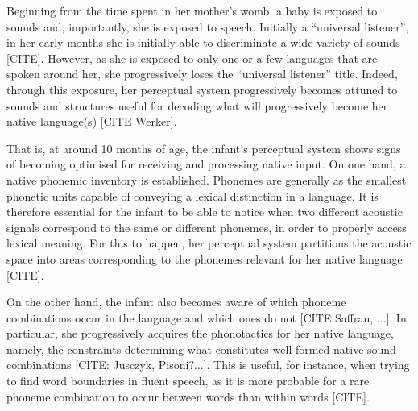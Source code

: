 
Beginning from the time spent in her mother's womb, a baby is exposed to sounds and, importantly, she is exposed to speech. Initially a ``universal listener'', in her early months she is initially able to discriminate a wide variety of sounds [CITE]. However, as she is exposed to only one or a few languages that are spoken around her, she progressively loses the ``universal listener'' title. Indeed, through this exposure, her perceptual system progressively becomes attuned to sounds and structures useful for decoding what will progressively become her native language(s) [CITE Werker].

That is, at around 10 months of age, the infant's perceptual system shows signs of becoming optimised for receiving and processing native input.
On one hand, a native phonemic inventory is established. Phonemes are generally as the smallest phonetic units capable of conveying a lexical distinction in a language. It is therefore essential for the infant to be able to notice when two different acoustic signals correspond to the same or different phonemes, in order to properly access lexical meaning. For this to happen, her perceptual system partitions the acoustic space into areas corresponding to the phonemes relevant for her native language [CITE]. 

On the other hand, the infant also becomes aware of which phoneme combinations occur in the language and which ones do not [CITE Saffran, ...]. In particular, she progressively acquires the phonotactics for her native language, namely, the constraints determining what constitutes well-formed native sound combinations [CITE: Jusczyk, Pisoni?...]. This is useful, for instance, when trying to find word boundaries in fluent speech, as it is more probable for a rare phoneme combination to occur between words than within words [CITE]. 


